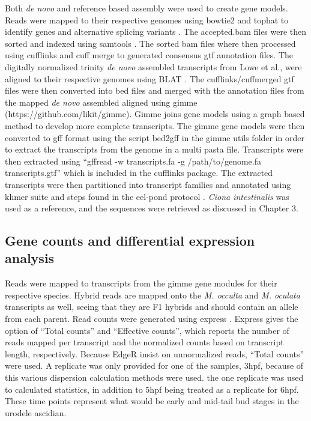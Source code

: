 Both \textit{de novo} and reference based assembly were used to create gene models. Reads were mapped to their respective genomes using bowtie2 and tophat to identify genes and alternative splicing variants \cite{langmead_fast_2012,trapnell_differential_2012}. The accepted.bam files were then sorted and indexed using samtools \cite{li_sequence_2009}. The sorted bam files where then processed using cufflinks and cuff merge to generated consensus gtf annotation files. The digitally normalized trinity \textit{de novo} assembled transcripts from Lowe et al., were aligned to their respective genomes using BLAT \cite{haas_novo_2013}. The cufflinks/cuffmerged gtf files were then converted into bed files and merged with the annotation files from the mapped \textit{de novo} assembled aligned using gimme (https://github.com/likit/gimme). Gimme joins gene models using a graph based method to develop more complete transcripts. The gimme gene models were then converted to gff format using the script bed2gff in the gimme utils folder in order to extract the transcripts from the genome in a multi pasta file. Transcripts were then extracted using ``gffread -w transcripts.fa -g /path/to/genome.fa transcripts.gtf'' which is included in the cufflinks package. The extracted transcripts were then partitioned into transcript families and annotated using khmer suite and steps found in the eel-pond protocol \cite{}. \textit{Ciona intestinalis} was used as a reference, and the sequences were retrieved as discussed in Chapter 3. 

\subsection{Gene counts and differential expression analysis}
Reads were mapped to transcripts from the gimme gene modules for their respective species. Hybrid reads are mapped onto the \textit{M. occulta} and \textit{M. oculata} transcripts as well, seeing that they are F1 hybrids and should contain an allele from each parent. Read counts were generated using express \cite{}. Express gives the option of ``Total counts'' and ``Effective counts'', which reports the number of reads mapped per transcript and the normalized counts based on transcript length, respectively. Because EdgeR insist on unnormalized reads, ``Total counts'' were used. A replicate was only provided for one of the samples, 3hpf, because of this various dispersion calculation methods were used. the one replicate was used to calculated statistics, in addition to 5hpf being treated as a replicate for 6hpf. These time points represent what would be early and mid-tail bud stages in the urodele ascidian. 

